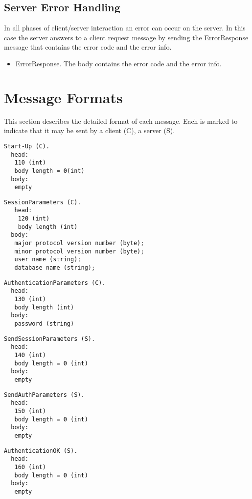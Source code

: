 \documentclass[a4paper,12pt]{article}
\begin{document}
\subsection{Server Error Handling}

In all phases of client/server interaction an error can occur on the server. In this case the server answers to a client request message by sending the ErrorResponse message that contains the error code and the error info.

\begin{itemize}
\item ErrorResponse. The body contains the error code and the error info. 
\end{itemize}



\section{Message Formats}

This section describes the detailed format of each message. Each is marked to indicate that it may be sent by a client (C), a server (S).

\begin{verbatim}
Start-Up (C).
  head:
   110 (int)
   body length = 0(int)
  body:
   empty
\end{verbatim}   

\begin{verbatim}
SessionParameters (C).
   head:
    120 (int)
    body length (int)
  body:
   major protocol version number (byte);
   minor protocol version number (byte);
   user name (string);
   database name (string);
\end{verbatim}   

\begin{verbatim}
AuthenticationParameters (C).
  head:
   130 (int)
   body length (int)
  body:
   password (string)
\end{verbatim}   

\begin{verbatim}
SendSessionParameters (S).
  head:
   140 (int)
   body length = 0 (int)
  body:
   empty 
\end{verbatim}
   
\begin{verbatim}
SendAuthParameters (S).
  head:
   150 (int)
   body length = 0 (int)
  body:
   empty
\end{verbatim}   
  
\begin{verbatim}  
AuthenticationOK (S).
  head:
   160 (int)
   body length = 0 (int)
  body:
   empty
\end{verbatim}   
\end{document}
